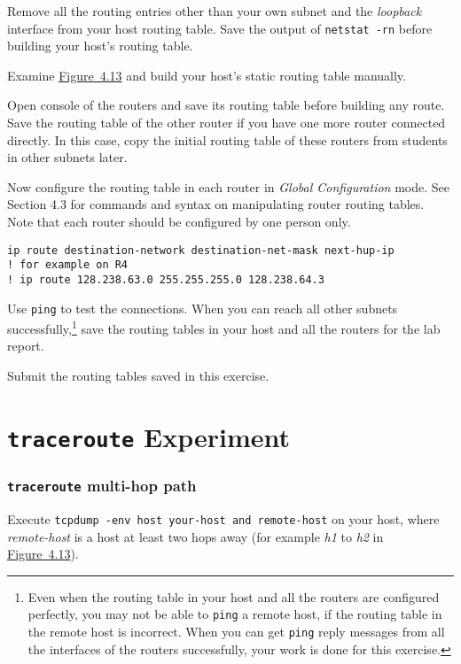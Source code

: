 \documentclass{../UTNetLab}
\begin{document}
    Remove all the routing entries other than your own subnet and the \textit{loopback} interface from your host routing table.
    Save the output of \lstinline{netstat -rn} before building your host’s routing table.

    Examine \hyperref[fig:4.13]{Figure~4.13} and build your host’s static routing table manually.

    Open console of the routers and save its routing table before building any route.
    Save the routing table of the other router if you have one more router connected directly.
    In this case, copy the initial routing table of these routers from students in other subnets later.

    Now configure the routing table in each router in \textit{Global Configuration} mode.
    See Section 4.3 for commands and syntax on manipulating router routing tables.
    Note that each router should be configured by one person only.

    \begin{lstlisting}[language={cisco}, emph={destination-network, destination-net-mask, next-hup-ip}]
ip route destination-network destination-net-mask next-hup-ip
! for example on R4
! ip route 128.238.63.0 255.255.255.0 128.238.64.3
    \end{lstlisting}

    Use \lstinline{ping} to test the connections.
    When you can reach all other subnets successfully,\footnote{Even when the routing table in your host and all the routers are configured perfectly, you may not be able to \lstinline{ping} a remote host, if the routing table in the remote host is incorrect.
    When you can get \lstinline{ping} reply messages from all the interfaces of the routers successfully, your work is done for this exercise.} save the routing tables in your host and all the routers for the lab report.
    
    \begin{report}
        \item Submit the routing tables saved in this exercise.
    \end{report}


\part{\texttt{traceroute} Experiment}\label{sec:traceroute}
\section{\texttt{traceroute} multi-hop path}
    Execute \lstinline[emph={your-host, remote-host}]{tcpdump -env host your-host and remote-host} on your host, where \textit{remote-host} is a host at least two hops away (for example \textit{h1} to \textit{h2} in \hyperref[fig:4.13]{Figure~4.13}).
\end{document}
